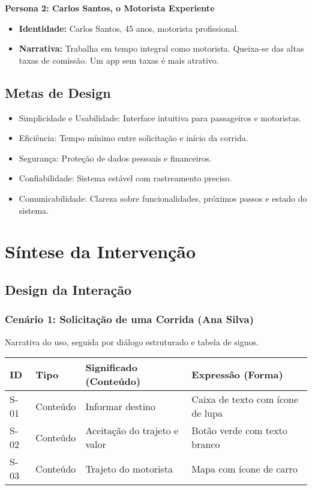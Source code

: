 \documentclass[12pt,a4paper]{article}
\begin{document}
\textbf{Persona 2: Carlos Santos, o Motorista Experiente}
\begin{itemize}
    \item \textbf{Identidade:} Carlos Santos, 45 anos, motorista profissional.
    \item \textbf{Narrativa:} Trabalha em tempo integral como motorista. Queixa-se das altas taxas de comissão. Um app sem taxas é mais atrativo.
\end{itemize}

\subsection{Metas de Design}
\begin{itemize}
    \item Simplicidade e Usabilidade: Interface intuitiva para passageiros e motoristas.
    \item Eficiência: Tempo mínimo entre solicitação e início da corrida.
    \item Segurança: Proteção de dados pessoais e financeiros.
    \item Confiabilidade: Sistema estável com rastreamento preciso.
    \item Comunicabilidade: Clareza sobre funcionalidades, próximos passos e estado do sistema.
\end{itemize}

\section{Síntese da Intervenção}

\subsection{Design da Interação}

\subsubsection{Cenário 1: Solicitação de uma Corrida (Ana Silva)}
Narrativa do uso, seguida por diálogo estruturado e tabela de signos.

\begin{longtable}{|p{1.5cm}|p{2.5cm}|p{5cm}|p{5cm}|}
\hline
\textbf{ID} & \textbf{Tipo} & \textbf{Significado (Conteúdo)} & \textbf{Expressão (Forma)} \\
\hline
S-01 & Conteúdo & Informar destino & Caixa de texto com ícone de lupa \\
\hline
S-02 & Conteúdo & Aceitação do trajeto e valor & Botão verde com texto branco \\
\hline
S-03 & Conteúdo & Trajeto do motorista & Mapa com ícone de carro \\
\hline
\end{longtable}
\end{document}
